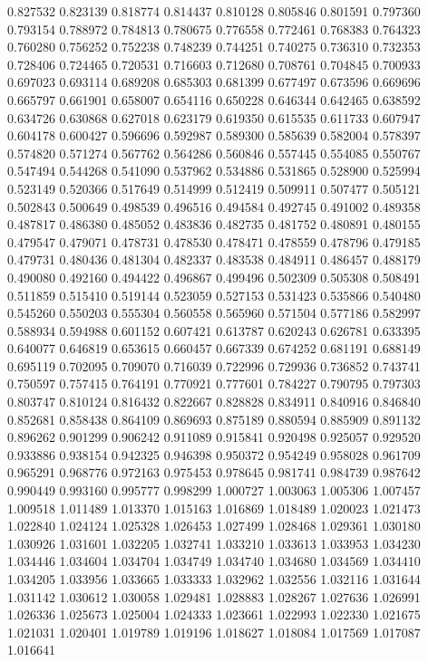 0.827532
0.823139
0.818774
0.814437
0.810128
0.805846
0.801591
0.797360
0.793154
0.788972
0.784813
0.780675
0.776558
0.772461
0.768383
0.764323
0.760280
0.756252
0.752238
0.748239
0.744251
0.740275
0.736310
0.732353
0.728406
0.724465
0.720531
0.716603
0.712680
0.708761
0.704845
0.700933
0.697023
0.693114
0.689208
0.685303
0.681399
0.677497
0.673596
0.669696
0.665797
0.661901
0.658007
0.654116
0.650228
0.646344
0.642465
0.638592
0.634726
0.630868
0.627018
0.623179
0.619350
0.615535
0.611733
0.607947
0.604178
0.600427
0.596696
0.592987
0.589300
0.585639
0.582004
0.578397
0.574820
0.571274
0.567762
0.564286
0.560846
0.557445
0.554085
0.550767
0.547494
0.544268
0.541090
0.537962
0.534886
0.531865
0.528900
0.525994
0.523149
0.520366
0.517649
0.514999
0.512419
0.509911
0.507477
0.505121
0.502843
0.500649
0.498539
0.496516
0.494584
0.492745
0.491002
0.489358
0.487817
0.486380
0.485052
0.483836
0.482735
0.481752
0.480891
0.480155
0.479547
0.479071
0.478731
0.478530
0.478471
0.478559
0.478796
0.479185
0.479731
0.480436
0.481304
0.482337
0.483538
0.484911
0.486457
0.488179
0.490080
0.492160
0.494422
0.496867
0.499496
0.502309
0.505308
0.508491
0.511859
0.515410
0.519144
0.523059
0.527153
0.531423
0.535866
0.540480
0.545260
0.550203
0.555304
0.560558
0.565960
0.571504
0.577186
0.582997
0.588934
0.594988
0.601152
0.607421
0.613787
0.620243
0.626781
0.633395
0.640077
0.646819
0.653615
0.660457
0.667339
0.674252
0.681191
0.688149
0.695119
0.702095
0.709070
0.716039
0.722996
0.729936
0.736852
0.743741
0.750597
0.757415
0.764191
0.770921
0.777601
0.784227
0.790795
0.797303
0.803747
0.810124
0.816432
0.822667
0.828828
0.834911
0.840916
0.846840
0.852681
0.858438
0.864109
0.869693
0.875189
0.880594
0.885909
0.891132
0.896262
0.901299
0.906242
0.911089
0.915841
0.920498
0.925057
0.929520
0.933886
0.938154
0.942325
0.946398
0.950372
0.954249
0.958028
0.961709
0.965291
0.968776
0.972163
0.975453
0.978645
0.981741
0.984739
0.987642
0.990449
0.993160
0.995777
0.998299
1.000727
1.003063
1.005306
1.007457
1.009518
1.011489
1.013370
1.015163
1.016869
1.018489
1.020023
1.021473
1.022840
1.024124
1.025328
1.026453
1.027499
1.028468
1.029361
1.030180
1.030926
1.031601
1.032205
1.032741
1.033210
1.033613
1.033953
1.034230
1.034446
1.034604
1.034704
1.034749
1.034740
1.034680
1.034569
1.034410
1.034205
1.033956
1.033665
1.033333
1.032962
1.032556
1.032116
1.031644
1.031142
1.030612
1.030058
1.029481
1.028883
1.028267
1.027636
1.026991
1.026336
1.025673
1.025004
1.024333
1.023661
1.022993
1.022330
1.021675
1.021031
1.020401
1.019789
1.019196
1.018627
1.018084
1.017569
1.017087
1.016641
